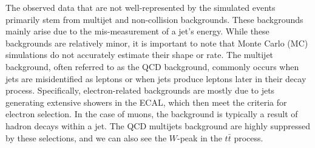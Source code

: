 The observed data that are not well-represented by the simulated events primarily stem from multijet and non-collision backgrounds. These backgrounds mainly arise due to the mis-measurement of a jet's energy. While these backgrounds are relatively minor, it is important to note that Monte Carlo (MC) simulations do not accurately estimate their shape or rate. The multijet background, often referred to as the QCD background, commonly occurs when jets are misidentified as leptons or when jets produce leptons later in their decay process. Specifically, electron-related backgrounds are mostly due to jets generating extensive showers in the ECAL, which then meet the criteria for electron selection. In the case of muons, the background is typically a result of hadron decays within a jet.
The QCD multijets background are highly suppressed by these selections, and we can also see the $W$-peak in the $t\bar{t}$ process.


